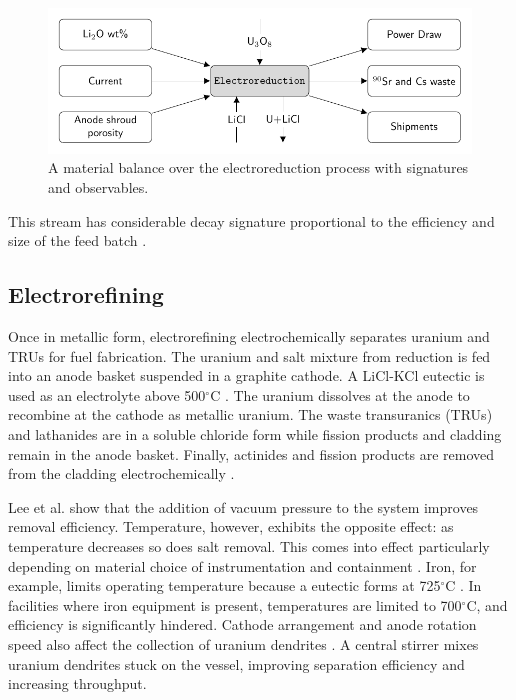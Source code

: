 \documentclass{anstrans}
\begin{document}
\begin{figure}[ht]
	\centering
	\includegraphics[width=1\linewidth]{reduction}
	\caption{A material balance over the electroreduction process with signatures and observables.}
	\label{fig:reduction}
\end{figure}

This stream has considerable decay signature proportional to the efficiency and size of the feed batch \cite{Borrelli_2017,flowsheet_1998}.

\subsection{Electrorefining}

Once in metallic form, electrorefining electrochemically separates uranium and TRUs for fuel fabrication.
The uranium and salt mixture from reduction is fed into an anode basket suspended in a graphite cathode. A LiCl-KCl eutectic is used as 
an electrolyte above 500$^{\circ}$C \cite{flowsheet_1998,lee_korean_2011}. The uranium dissolves at the anode to recombine at 
the cathode as metallic uranium. The waste transuranics (TRUs) and lathanides are in a soluble chloride form  while fission 
products and cladding remain in the anode basket. Finally, actinides and fission products are removed from the cladding 
electrochemically \cite{lee_korean_2011}.

Lee et al. \cite{lee_advanced_2008} show that the addition of vacuum pressure to the system improves removal efficiency. 
Temperature, however, exhibits the opposite effect: as temperature decreases so does salt removal. This comes into effect 
particularly depending on material choice of instrumentation and containment \cite{lee_advanced_2008}. 
Iron, for example, limits operating temperature because a eutectic forms at 725$^{\circ}$C \cite{chapman_revision_1984}.
In facilities where iron equipment is present, temperatures are limited to 700$^{\circ}$C, and efficiency is significantly hindered. 
Cathode arrangement and anode rotation speed also affect the collection of uranium 
dendrites \cite{lee_advanced_2008}. A central stirrer mixes uranium dendrites stuck on 
the vessel, improving separation efficiency and increasing throughput. 
\end{document}
